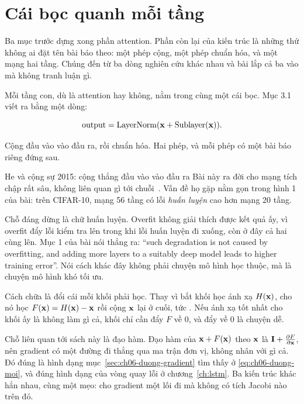 \section{Cái bọc quanh mỗi tầng}
\label{sec:ch07-quanh-tang}

%
Ba mục trước dựng xong phần attention. Phần còn lại của kiến trúc là những thứ
không ai đặt tên bài báo theo: một phép cộng, một phép chuẩn hóa, và một mạng
hai tầng. Chúng đến từ ba dòng nghiên cứu khác nhau và bài lắp cả ba vào mà
không tranh luận gì.

Mỗi tầng con, dù là attention hay không, nằm trong cùng một cái bọc. Mục 3.1
viết ra bằng một dòng:

\begin{equation}
  \mathrm{output} = \operatorname{LayerNorm}(\mathbf{x} + \mathrm{Sublayer}(\mathbf{x})).
  \label{eq:ch07-post-ln}
\end{equation}

Cộng đầu vào vào đầu ra, rồi chuẩn hóa. Hai phép, và mỗi phép có một bài báo
riêng đứng sau.

\begin{bridge}{He và cộng sự 2015: cộng thẳng đầu vào vào đầu ra}
%
Bài này ra đời cho mạng tích chập rất sâu, không liên quan gì tới
chuỗi~\autocite{he2016deep}. Vấn đề họ gặp nằm gọn trong hình 1 của bài: trên
CIFAR-10, mạng 56 tầng có lỗi \emph{huấn luyện} cao hơn mạng 20 tầng.

Chỗ đáng dừng là chữ huấn luyện. Overfit không giải thích được kết quả ấy, vì
overfit đẩy lỗi kiểm tra lên trong khi lỗi huấn luyện đi xuống, còn ở đây cả
hai cùng lên. Mục 1 của bài nói thẳng ra:
\enquote{such degradation is not caused by overfitting, and adding more layers
to a suitably deep model leads to higher training error}. Nói cách khác đây
không phải chuyện mô hình học thuộc, mà là chuyện mô hình khó tối ưu.

Cách chữa là đổi cái mỗi khối phải học. Thay vì bắt khối học ánh xạ
\(H(\mathbf{x})\), cho nó học \(F(\mathbf{x}) = H(\mathbf{x}) - \mathbf{x}\) rồi cộng
\(\mathbf{x}\) lại ở cuối, tức . Nếu ánh xạ
tốt nhất cho khối ấy là không làm gì cả, khối chỉ cần đẩy \(F\) về 0, và đẩy về
0 là chuyện dễ.

Chỗ liên quan tới sách này là đạo hàm. Đạo hàm của \(\mathbf{x} + F(\mathbf{x})\)
theo \(\mathbf{x}\) là \(\mathbf{I} + \frac{\partial F}{\partial \mathbf{x}}\), nên gradient có một đường
đi thẳng qua ma trận đơn vị, không nhân với gì cả. Đó đúng là hình dạng
mục~\ref{sec:ch06-duong-gradient} tìm thấy ở \eqref{eq:ch06-duong-moi}, và đúng
hình dạng của vòng quay lỗi ở chương~\ref{ch:lstm}. Ba kiến trúc khác hẳn nhau,
cùng một mẹo: cho gradient một lối đi mà không có tích Jacobi nào trên đó.
\end{bridge}

